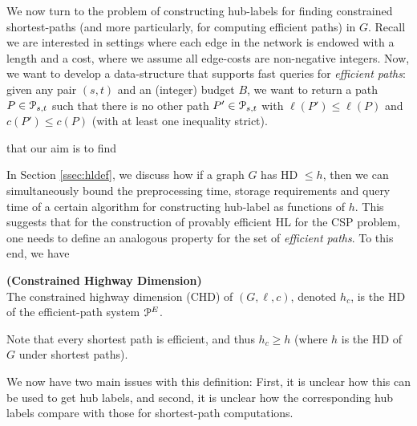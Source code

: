 
We now turn to the problem of constructing hub-labels for finding constrained shortest-paths (and more particularly, for computing efficient paths) in $G$. 
Recall we are interested in settings where each edge in the network is endowed with a length and a cost, where we assume all edge-costs are non-negative integers.
Now, we want to develop a data-structure that supports fast queries for \emph{efficient paths}: given any pair $(s,t)$ and an (integer) budget $B$, we want to return a path $P\in \mathcal{P}_{s,t}$ such that there is no other path $P'\in \mathcal{P}_{s,t}$ with $\ell(P')\leq \ell(P)$ and $c(P')\leq c(P)$ (with at least one inequality strict). 

that our aim is to find 

In Section \ref{ssec:hldef}, we discuss how if a graph $G$ has HD $\leq h$, then we can simultaneously bound the preprocessing time, storage requirements and query time of a certain algorithm for constructing hub-label as functions of $h$.
This suggests that for the construction of provably efficient HL for the CSP problem, one needs to define an analogous property for the set of \emph{efficient paths}.
To this end, we have
\begin{definition}
\textbf{(Constrained Highway Dimension)}\\ The constrained highway dimension (CHD) of $(G,\ell,c)$, denoted $h_c$, is the HD of the efficient-path system $\mathcal{P}^E$.
\end{definition}
Note that every shortest path is efficient, and thus $h_c\geq h$ (where $h$ is the HD of $G$ under shortest paths).


We now have two main issues with this definition: First, it is unclear how this can be used to get hub labels, and second, it is unclear how the corresponding hub labels compare with those for shortest-path computations. 




